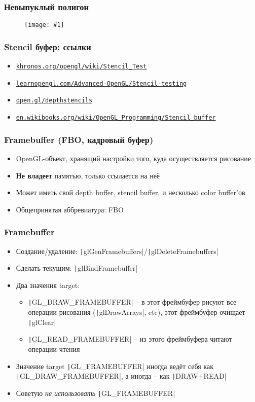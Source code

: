 \documentclass[10pt]{beamer}
\newcommand{\slideimage}[1]{
  \begin{figure}
    \begin{adjustbox}{width=\textwidth, totalheight=\textheight-2\baselineskip-2\baselineskip,keepaspectratio}
      \texttt{[image: \#1]}
    \end{adjustbox}
  \end{figure}
}
\begin{document}

\begin{frame}[fragile]
\frametitle{Невыпуклый полигон}
\slideimage{non-convex-polygon.png}
\end{frame}

\begin{frame}[fragile]
\frametitle{Stencil буфер: ссылки}
\begin{itemize}
\item \href{https://www.khronos.org/opengl/wiki/Stencil_Test}{\texttt{khronos.org/opengl/wiki/Stencil\_Test}}
\item \href{https://learnopengl.com/Advanced-OpenGL/Stencil-testing}{\texttt{learnopengl.com/Advanced-OpenGL/Stencil-testing}}
\item \href{https://open.gl/depthstencils}{\texttt{open.gl/depthstencils}}
\item \href{https://en.wikibooks.org/wiki/OpenGL_Programming/Stencil_buffer}{\nolinkurl{en.wikibooks.org/wiki/OpenGL_Programming/Stencil_buffer}}
\end{itemize}
\end{frame}

\begin{frame}[fragile]
\frametitle{Framebuffer (FBO, кадровый буфер)}
\begin{itemize}
\item OpenGL-объект, хранящий настройки того, куда осуществляется рисование
\pause
\item \textbf{\alert{Не владеет}} памятью, только ссылается на неё
\pause
\item Может иметь свой depth buffer, stencil buffer, и несколько color buffer'ов
\pause
\item Общепринятая аббревиатура: FBO
\end{itemize}
\end{frame}

\begin{frame}[fragile]
\frametitle{Framebuffer}
\begin{itemize}
\item Создание/удаление: \texttt|glGenFramebuffers|/\texttt|glDeleteFramebuffers|
\pause
\item Сделать текущим: \texttt|glBindFramebuffer|
\pause
\item Два значения target:
\begin{itemize}
\item \texttt|GL_DRAW_FRAMEBUFFER| -- в этот фреймбуфер рисуют все операции рисования (\texttt|glDrawArrays|, etc), этот фреймбуфер очищает \texttt|glClear|
\pause
\item \texttt|GL_READ_FRAMEBUFFER| -- из этого фреймбуфера читают операции чтения
\end{itemize}  
\pause
\item Значение target \texttt|GL_FRAMEBUFFER| иногда ведёт себя как \texttt|GL_DRAW_FRAMEBUFFER|, а иногда -- как \texttt|DRAW+READ|
\item Советую \textit{не использовать} \texttt|GL_FRAMEBUFFER|
\end{itemize}
\end{frame}
\end{document}
